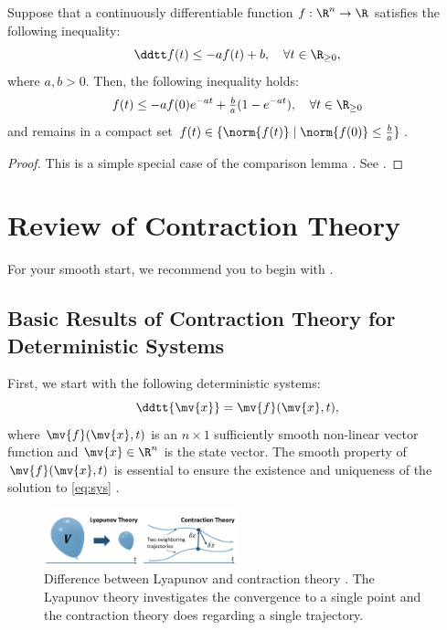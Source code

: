 \documentclass{article}
\newcommand*{\bdx}{\mv{x}} %
\newcommand*{\bdf}{\mv{f}} %
\begin{document}
\begin{lem}
	Suppose that a continuously differentiable function $f:\R^n\to\R$ satisfies the following inequality:
	\begin{equation}
		\ddtt f(t)\le -a f(t)+ b, \quad \forall t\in\R_{\ge 0}
		,
	\end{equation}
	where $a,b>0$.
	Then, the following inequality holds:
	\begin{equation}
		f(t)\le -af(0)e^{-at} + \tfrac{b}{a}(1-e^{-at}), \quad \forall t\in\R_{\ge 0}
	\end{equation}
	and remains in a compact set $f(t)\in\{\norm{f(t)} \mid \norm{f(0)}\le \tfrac{b}{a}\}$.
	\label{lem:comparison}
\end{lem}

\begin{proof}
	This is a simple special case of the comparison lemma \cite[pp. 102-103]{Khalil:2002aa}.
	See \cite[pp. 659-660]{Khalil:2002aa}.
\end{proof}

\section{Review of Contraction Theory}

For your smooth start, we recommend you to begin with \cite{LOHMILLER:1998aa}.

\subsection{Basic Results of Contraction Theory for Deterministic Systems}

First, we start with the following deterministic systems:
\begin{equation}
    \ddtt{\bdx}
    = 
    \bdf(\bdx,t)
    ,
    \label{eq:sys}
\end{equation}
where $\bdf(\bdx,t)$ is an $n\times1$ sufficiently smooth non-linear vector function and $\bdx\in\R^n$ is the state vector.
The smooth property of $\bdf(\bdx,t)$ is essential to ensure the existence and uniqueness of the solution to \eqref{eq:sys} \cite[see, pp. 88-89]{Khalil:2002aa}.

\begin{figure}[!ht]
    \centering
    \includegraphics[width=0.5\textwidth]{figs/lyaVSctrac.png}
    \caption{
        Difference between Lyapunov and contraction theory \cite[Fig. 1]{Tsukamoto:2021aa}.
        The Lyapunov theory investigates the convergence to a single point and the contraction theory does regarding a single trajectory.
    }
    \label{fig:lyaVSctrac}
\end{figure}
\end{document}
